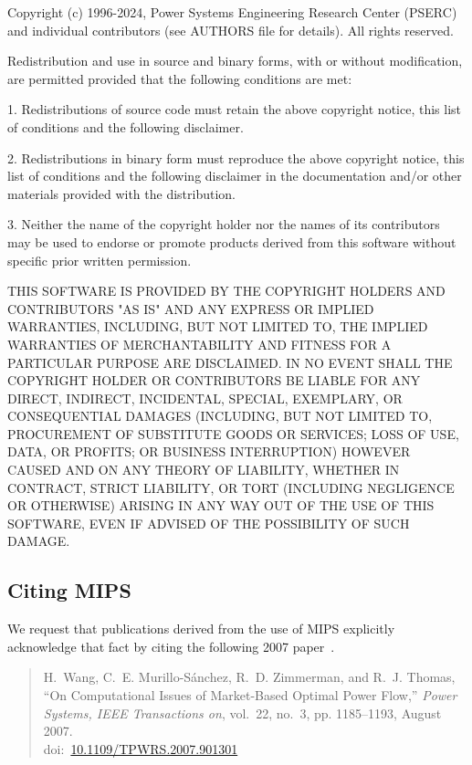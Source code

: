 \documentclass[12pt]{article}
\newcommand{\mips}[0]{{MIPS}}
\newcommand{\doi}[1]{doi:~\href{https://doi.org/#1}{#1}}
\numberwithin{equation}{section}
\numberwithin{table}{section}
\numberwithin{figure}{section}
\begin{document}
\begin{Notice}
Copyright (c) 1996-2024, Power Systems Engineering Research Center
(PSERC) and individual contributors (see AUTHORS file for details).
All rights reserved.

Redistribution and use in source and binary forms, with or without
modification, are permitted provided that the following conditions
are met:

1. Redistributions of source code must retain the above copyright
notice, this list of conditions and the following disclaimer.

2. Redistributions in binary form must reproduce the above copyright
notice, this list of conditions and the following disclaimer in the
documentation and/or other materials provided with the distribution.

3. Neither the name of the copyright holder nor the names of its
contributors may be used to endorse or promote products derived from
this software without specific prior written permission.

THIS SOFTWARE IS PROVIDED BY THE COPYRIGHT HOLDERS AND CONTRIBUTORS
"AS IS" AND ANY EXPRESS OR IMPLIED WARRANTIES, INCLUDING, BUT NOT
LIMITED TO, THE IMPLIED WARRANTIES OF MERCHANTABILITY AND FITNESS
FOR A PARTICULAR PURPOSE ARE DISCLAIMED. IN NO EVENT SHALL THE
COPYRIGHT HOLDER OR CONTRIBUTORS BE LIABLE FOR ANY DIRECT, INDIRECT,
INCIDENTAL, SPECIAL, EXEMPLARY, OR CONSEQUENTIAL DAMAGES (INCLUDING,
BUT NOT LIMITED TO, PROCUREMENT OF SUBSTITUTE GOODS OR SERVICES;
LOSS OF USE, DATA, OR PROFITS; OR BUSINESS INTERRUPTION) HOWEVER
CAUSED AND ON ANY THEORY OF LIABILITY, WHETHER IN CONTRACT, STRICT
LIABILITY, OR TORT (INCLUDING NEGLIGENCE OR OTHERWISE) ARISING IN
ANY WAY OUT OF THE USE OF THIS SOFTWARE, EVEN IF ADVISED OF THE
POSSIBILITY OF SUCH DAMAGE.
\end{Notice}

\subsection{Citing \mips{}}

We request that publications derived from the use of \mips{} explicitly acknowledge that fact by citing the following 2007 paper~\cite{wang2007a}.

\begin{quote}
\footnotesize
H.~Wang, C.~E. Murillo-S{\'a}nchez, R.~D. Zimmerman, and R.~J. Thomas, ``On
Computational Issues of Market-Based Optimal Power Flow,'' \emph{Power
Systems, IEEE Transactions on}, vol.~22, no.~3, pp. 1185--1193, August 2007.\\
\doi{10.1109/TPWRS.2007.901301}
\end{quote}
\end{document}
